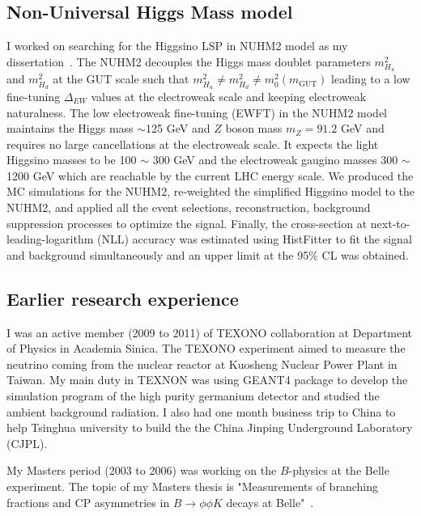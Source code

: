 \documentclass[12pt]{article}
\begin{document}
\subsection{Non-Universal Higgs Mass model}
I worked on searching for the Higgsino LSP in NUHM2 model as my dissertation~\cite{Aaboud:2017leg}.
The NUHM2 decouples the Higgs mass doublet parameters $m^{2}_{H_{u}}$ and $m^{2}_{H_{d}}$ at the GUT scale such that $m^{2}_{H_{u}} \neq m^{2}_{H_{d}} \neq m^{2}_{0}(m_{\textrm{GUT}})$ leading to a low fine-tuning $\Delta_{EW}$ values at the electroweak scale and keeping electroweak naturalness.
The low electroweak fine-tuning (EWFT) in the NUHM2 model maintains the Higgs mass $\sim$125 GeV and $Z$ boson mass $m_{Z} = 91.2$ GeV and requires no large cancellations at the electroweak scale. 
It expects the light Higgsino masses to be 100 $\sim$ 300 GeV and the electroweak gaugino masses 300 $\sim$ 1200 GeV which are reachable by the current LHC energy scale.
We produced the MC simulations for the NUHM2, re-weighted the simplified Higgsino model to the NUHM2, and applied all the event selections, reconstruction, background suppression processes to optimize the signal.
Finally, the cross-section at next-to-leading-logarithm (NLL) accuracy was estimated using HistFitter to fit the signal and background simultaneously and an upper limit at the 95\% CL was obtained.

\subsection{Earlier research experience}
I was an active member (2009 to 2011) of TEXONO collaboration at Department of Physics in Academia Sinica.
The TEXONO experiment aimed to measure the neutrino coming from the nuclear reactor at Kuosheng Nuclear Power Plant in Taiwan.
My main duty in TEXNON was using GEANT4 package to develop the simulation program of the high purity germanium detector and studied the ambient background radiation.
I also had one month business trip to China to help Tsinghua university to build the the China Jinping Underground Laboratory (CJPL).

My Masters period (2003 to 2006) was working on the $B$-physics at the Belle experiment.
The topic of my Masters thesis is "Measurements of branching fractions and CP asymmetries in $B \to \phi \phi K$ decays at Belle"~\cite{Abe:2006qy, Shen:2008pr}.

\end{document}
